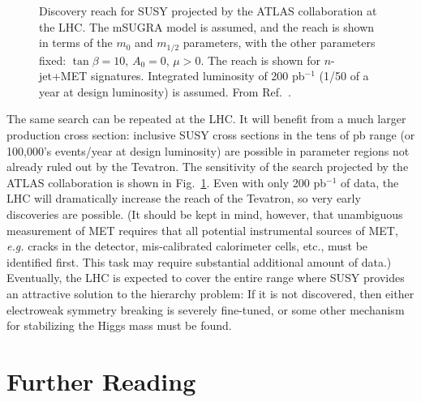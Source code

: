 \documentclass{ws-procs9x6}
\begin{document}
\begin{figure}
\begin{center}
\end{center}
\caption{Discovery reach for SUSY projected by the ATLAS collaboration at the LHC. The mSUGRA model is assumed, and the reach is shown in terms of the $m_0$ and $m_{1/2}$ parameters, with the other parameters fixed: $\tan\beta=10$, $A_0=0$, $\mu>0$. The reach is shown for $n$-jet+MET signatures. Integrated luminosity of 200 pb$^{-1}$ (1/50 of a year at design luminosity) is assumed. From Ref.~\cite{LHC_susy}.}
\label{fig:LHC_susy}
\end{figure}

The same search can be repeated at the LHC. It will benefit from a much larger production cross section: inclusive SUSY cross sections in the tens of pb range (or 100,000's events/year at design luminosity) are possible in parameter regions not already ruled out by the Tevatron. The sensitivity of the search projected by the ATLAS collaboration is shown in Fig.~\ref{fig:LHC_susy}. Even with only 200 pb$^{-1}$ of data, the LHC will dramatically increase the reach of the Tevatron, so very early discoveries are possible. (It should be kept in mind, however, that unambiguous measurement of MET requires that all potential instrumental sources of MET, {\it e.g.} cracks in the detector, mis-calibrated calorimeter cells, etc., must be identified first. This task may require substantial additional amount of data.) 
Eventually, the LHC is expected to cover the entire range where SUSY provides an attractive solution to the hierarchy problem: If it is not discovered, then either electroweak symmetry breaking is severely fine-tuned, or some other mechanism for stabilizing the Higgs mass must be found.

\section{Further Reading}
\label{readings}
\end{document}
